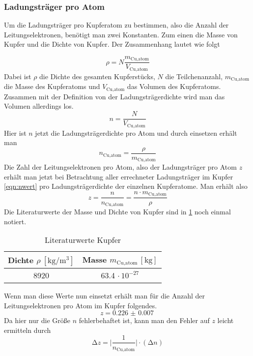\subsubsection{Ladungsträger pro Atom}
Um die Ladungsträger pro Kupferatom zu bestimmen, also die Anzahl der Leitungselektronen, benötigt man zwei Konstanten.
Zum einen die Masse von Kupfer und die Dichte von Kupfer. Der Zusammenhang lautet wie folgt

\begin{equation}
\nonumber
\rho = N \frac{m_{\text{Cu,atom}}}{V_{\text{Cu,atom}}}
\end{equation}
Dabei ist $\rho$ die Dichte des gesamten Kupferstücks, $N$ die Teilchenanzahl, $m_{\text{Cu,atom}}$ die Masse des Kupferatoms und $V_{\text{Cu,atom}}$ das Volumen des Kupferatoms.
Zusammen mit der Definition von der Ladungsträgerdichte wird man das Volumen allerdings los.
\begin{equation}
\nonumber
n = \frac{N}{V_{\text{Cu,atom}}}
\end{equation}
Hier ist $n$ jetzt die Ladungsträgerdichte pro Atom und durch einsetzen erhält man
\begin{equation}
\nonumber
n_{\text{Cu,atom}} = \frac{\rho}{m_{\text{Cu,atom}}}
\end{equation}
Die Zahl der Leitungselektronen pro Atom, also der Ladungsträger pro Atom $z$ erhält man jetzt bei Betrachtung aller errechneter Ladungsträger im Kupfer \eqref{eqn:nwert} pro 
Ladungsträgerdichte der einzelnen Kupferatome. Man erhält also
\begin{equation}
\nonumber
z = \frac{n}{n_{\text{Cu,atom}}} = \frac{n \cdot m_{\text{Cu,atom}}}{\rho}
\end{equation}
Die Literaturwerte der Masse und Dichte von Kupfer sind in \ref{tab:kupferlit} noch einmal notiert.
\begin{table}
  \centering
  \caption{Literaturwerte Kupfer}
  \label{tab:kupferlit}
  \begin{tabular}{c c }
    Dichte {$\rho \: [\si{\kilo\gram\per\meter\cubed}]$} & Masse $m_{\text{Cu,atom}} \, [\si{\kilo\gram}]$\\
    \midrule
    8920   & 63.4 $\cdot \, 10^{-27}$ \\
    \bottomrule
  \end{tabular}
\end{table}
Wenn man diese Werte nun einsetzt erhält man für die Anzahl der Leitungselektronen pro Atom im Kupfer folgendes.
\begin{equation}
z = \SI{0.226(7)}{}
\end{equation}
Da hier nur die Größe $n$ fehlerbehaftet ist, kann man den Fehler auf $z$ leicht ermitteln durch
\begin{equation}
\increment z = \biggl| \frac{1}{n_{\text{Cu,atom}}}\biggr| \cdot (\increment n)
\end{equation}

